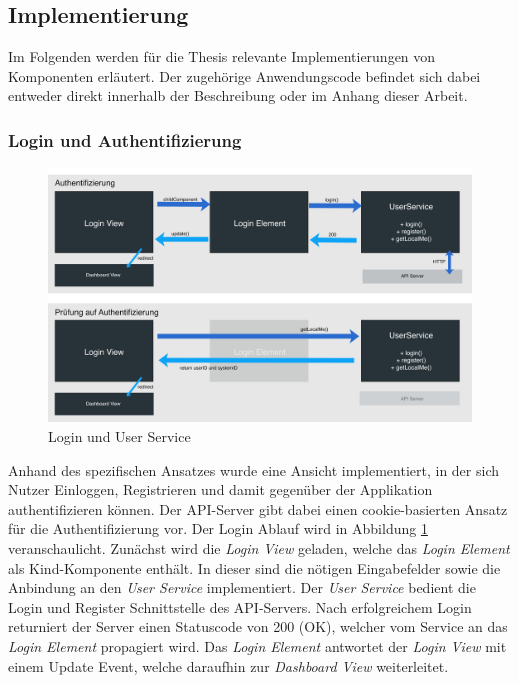 \subsection{Implementierung}

Im Folgenden werden für die Thesis relevante Implementierungen von Komponenten erläutert.
Der zugehörige Anwendungscode befindet sich dabei entweder direkt innerhalb der Beschreibung oder im Anhang dieser Arbeit.

\subsubsection{Login und Authentifizierung}
\label{Login-und-Authentifikation}

\begin{figure}[hptb]
 \centering
 \includegraphics[width=\linewidth]{kapitel4/login.jpg}
 \caption{Login und User Service}
 \label{kapitel4/login}
\end{figure}
\vspace{0.3cm}

Anhand des spezifischen Ansatzes wurde eine Ansicht implementiert, in der sich Nutzer Einloggen, Registrieren und damit gegenüber der Applikation authentifizieren können.
Der \ac{API}-Server gibt dabei einen cookie-basierten Ansatz für die Authentifizierung vor. Der Login Ablauf wird in Abbildung \ref{kapitel4/login} veranschaulicht.
Zunächst wird die \emph{Login View} geladen, welche das \emph{Login Element} als Kind-Komponente enthält.
In dieser sind die nötigen Eingabefelder sowie die Anbindung an den \emph{User Service} implementiert.
Der \emph{User Service} bedient die Login und Register Schnittstelle des \ac{API}-Servers.
Nach erfolgreichem Login returniert der Server einen Statuscode von 200 (OK), welcher vom Service an das \emph{Login Element} propagiert wird.
Das \emph{Login Element} antwortet der \emph{Login View} mit einem Update Event, welche daraufhin zur \emph{Dashboard View} weiterleitet.


